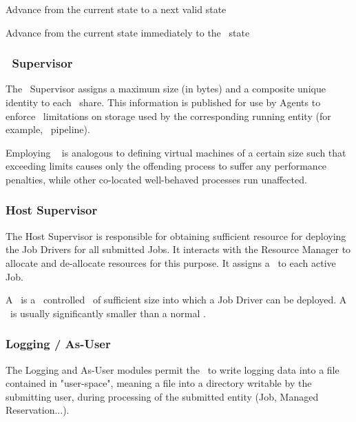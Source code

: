 \begin{itemize}
    \begin{description}
    
    \item Advance from the current state to a next valid state
    \item Advance from the current state immediately to the \varCompleted~state
          
    \end{description} 
    
    \subsubsection{\varLinuxControlGroup~Supervisor}  
    
    The \varLinuxControlGroup~Supervisor assigns a maximum size (in bytes) and a composite
    unique identity to each \varDUCC~share. This information is published for use
    by Agents to enforce \varLinuxControlGroup~limitations on storage used by the corresponding
    running entity (for example, \varUIMA~pipeline).
    
    Employing \varLinuxControlGroups~ is analogous to defining virtual machines of a certain
    size such that exceeding limits causes only the offending process to suffer
    any performance penalties, while other co-located well-behaved processes
    run unaffected.
    
    \subsubsection{Host Supervisor}
    
    The Host Supervisor is responsible for obtaining sufficient resource for
    deploying the Job Drivers for all submitted Jobs. It interacts with the
    Resource Manager to allocate and de-allocate resources for this purpose.
    It assigns a \varJdShare~to each active Job.
    
    A \varJdShare~is a \varLinuxControlGroup~controlled \varShare~of sufficient size into which a Job
    Driver can be deployed.  A \varJdShare~is usually significantly smaller than
    a normal \varShare.
    
    \subsubsection{Logging / As-User} 
    
    The Logging and As-User modules permit the \varOrchestrator~to write logging data into
    a file contained in "user-space", meaning a file into a directory writable 
    by the submitting user, during processing of the submitted entity 
    (Job, Managed Reservation...).
    

\end{itemize}
